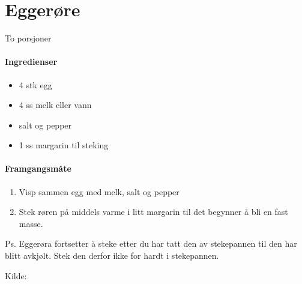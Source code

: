 \section{﻿Eggerøre}
To porsjoner

\paragraph{Ingredienser}
\begin{itemize}[noitemsep]
	\item 4 stk egg
	\item 4 ss melk eller vann
	\item salt og pepper
	\item 1 ss margarin til steking
\end{itemize}

\paragraph{Framgangsmåte}
\begin{enumerate}[noitemsep]
	\item Visp sammen egg med melk, salt og pepper
	\item Stek røren på middels varme i litt margarin til det begynner å bli en fast masse.
\end{enumerate}

Ps. Eggerøra fortsetter å steke etter du har tatt den av stekepannen til den har blitt avkjølt. Stek den derfor ikke for hardt i stekepannen.

Kilde: \href{http://www.matprat.no/sunn/sunne-oppskrifter/sunne-oppskrifter-god-samvittighet/eggerore/}{}
